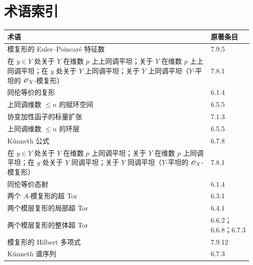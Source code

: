 \section*{术语索引}
\begin{longtable}{@{}p{.77\linewidth}p{.18\linewidth}@{}}
\toprule 术语 & 原著条目\\\midrule\endhead
模复形的 Euler--Poincaré 特征数 & 7.9.5\\
在 $y\in Y$ 处关于 $Y$ 在维数 $p$ 上上同调平坦；关于 $Y$ 在维数 $p$ 上上同调平坦；在 $y$ 处关于 $Y$ 上同调平坦；关于 $Y$ 上同调平坦（$Y$-平坦的 $\mathscr O_X$-模复形） & 7.8.1\\
同伦等价的复形 & 6.1.4\\
上同调维数 $\leq n$ 的赋环空间 & 6.5.5\\
协变加性函子的标量扩张 & 7.1.3\\
上同调维数 $\leq n$ 的环层 & 6.5.5\\
Künneth 公式 & 6.7.8\\
在 $y\in Y$ 处关于 $Y$ 在维数 $p$ 上同调平坦；关于 $Y$ 在维数 $p$ 上同调平坦；在 $y$ 处关于 $Y$ 同调平坦；关于 $Y$ 同调平坦（$Y$-平坦的 $\mathscr O_X$-模复形） & 7.8.1\\
同伦等价态射 & 6.1.4\\
两个 $A$-模复形的超 Tor & 6.3.1\\
两个模层复形的局部超 Tor & 6.4.1\\
两个模层复形的整体超 Tor & 6.6.2；6.6.8；6.7.3\\
模复形的 Hilbert 多项式 & 7.9.12\\
Künneth 谱序列 & 6.7.3\\
\bottomrule
\end{longtable}

